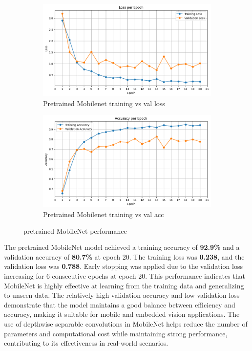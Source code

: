 \documentclass[12pt]{article}
\begin{document}
\begin{figure}[ht]
    \centering
    \begin{subfigure}{0.45\linewidth}
        \centering
        \includegraphics[width=\linewidth]{t4_mobilenet_loss.png}
        \caption{Pretrained Mobilenet training vs val loss}
        \label{fig:t4_mobilenet_loss}
    \end{subfigure}
    \hfill
    \begin{subfigure}{0.45\linewidth}
        \centering
        \includegraphics[width=\linewidth]{t4_mobilenet_acc.png}
        \caption{Pretrained Mobilenet training vs val acc}
        \label{fig:t4_mobilenet_acc}
    \end{subfigure}
    \caption{pretrained MobileNet performance}
    \label{fig:t4_mobilenet_performance}
\end{figure}

The pretrained MobileNet model achieved a training accuracy of \textbf{92.9\%} and a validation accuracy of \textbf{80.7\%} at epoch 20. The training loss was \textbf{0.238}, and the validation loss was \textbf{0.788}. Early stopping was applied due to the validation loss increasing for 6 consecutive epochs at epoch 20. This performance indicates that MobileNet is highly effective at learning from the training data and generalizing to unseen data. The relatively high validation accuracy and low validation loss demonstrate that the model maintains a good balance between efficiency and accuracy, making it suitable for mobile and embedded vision applications. The use of depthwise separable convolutions in MobileNet helps reduce the number of parameters and computational cost while maintaining strong performance, contributing to its effectiveness in real-world scenarios.
\end{document}
